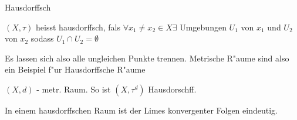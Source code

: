 \documentclass[class=article, crop=false]{standalone}
\begin{document}
\begin{zettel}{Hausdorffsch}
\begin{flashcard}
    \begin{definition}[hausdorffsch]
        $(X, \tau )$ heisst hausdorffsch, fals $\forall x_1 \neq x_2 \in  X \exists $ Umgebungen $U_1 $  von $x_1 $ und $U_2 $ von $x_2$ sodass $U_1 \cap U_2 = \emptyset$  
    \end{definition}

\end{flashcard}
    \begin{remark}
        Es lassen sich also alle ungleichen Punkte trennen. Metrische R"aume sind also ein Beispiel f"ur Hausdorffsche R"aume
    \end{remark}
\begin{example}
    $(X,d) $ - metr. Raum. So ist $ (X,\tau^d) $ Hausdorschff.
\end{example}
\begin{lemma}
   In einem hausdorffschen Raum ist der Limes konvergenter Folgen eindeutig.
\end{lemma}
\end{zettel}
\end{document}
